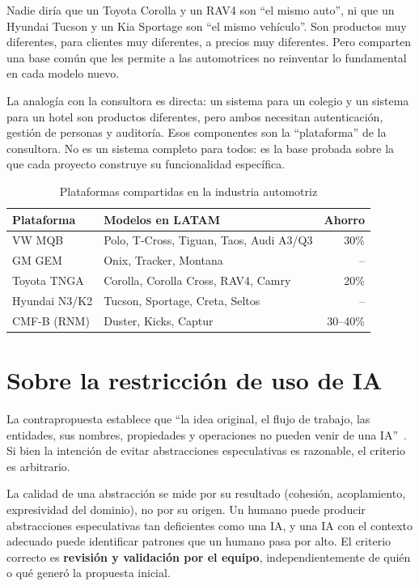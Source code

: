 \documentclass[conference]{IEEEtran}
\begin{document}
Nadie dir\'ia que un Toyota Corolla y un RAV4 son ``el mismo
auto'', ni que un Hyundai Tucson y un Kia Sportage son ``el mismo
veh\'iculo''. Son productos muy diferentes, para clientes muy
diferentes, a precios muy diferentes. Pero comparten una base com\'un que les permite a
las automotrices no reinventar lo fundamental en cada modelo nuevo.

La analog\'ia con la consultora es directa: un sistema para un
colegio y un sistema para un hotel son productos diferentes, pero
ambos necesitan autenticaci\'on, gesti\'on de personas y
auditor\'ia. Esos componentes son la ``plataforma'' de la
consultora. No es un sistema completo para todos: es la base
probada sobre la que cada proyecto construye su funcionalidad
espec\'ifica.

\begin{table}[H]
\centering
\caption{Plataformas compartidas en la industria automotriz}
\label{tab:autos}
\small
\begin{tabularx}{\columnwidth}{l >{\raggedright\arraybackslash}X r}
\toprule
\textbf{Plataforma} & \textbf{Modelos en LATAM} & \textbf{Ahorro} \\
\midrule
VW MQB & Polo, T-Cross, Tiguan, Taos, Audi A3/Q3 & 30\% \\
GM GEM & Onix, Tracker, Montana & -- \\
Toyota TNGA & Corolla, Corolla Cross, RAV4, Camry & 20\% \\
Hyundai N3/K2 & Tucson, Sportage, Creta, Seltos & -- \\
CMF-B (RNM) & Duster, Kicks, Captur & 30--40\% \\
\bottomrule
\end{tabularx}
\end{table}

\section{Sobre la restricci\'on de uso de IA}

La contrapropuesta establece que ``la idea original, el flujo de
trabajo, las entidades, sus nombres, propiedades y operaciones no
pueden venir de una IA''~\cite{araoz2026}. Si bien la intenci\'on
de evitar abstracciones especulativas es razonable, el criterio
es arbitrario.

La calidad de una abstracci\'on se mide por su resultado
(cohesi\'on, acoplamiento, expresividad del dominio), no por su
origen. Un humano puede producir abstracciones especulativas
tan deficientes como una IA, y una IA con el contexto adecuado
puede identificar patrones que un humano pasa por alto. El
criterio correcto es \textbf{revisi\'on y validaci\'on por el
equipo}, independientemente de qui\'en o qu\'e gener\'o la
propuesta inicial.
\end{document}
